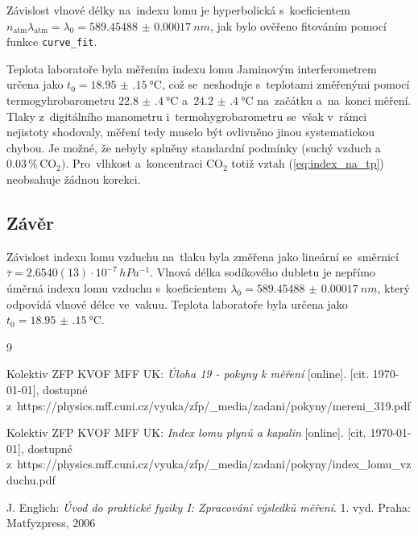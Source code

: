 \documentclass{../concepts/titul_zprava_p/prepareprotokolZprava} %
\begin{document}
Závislost vlnové délky na~indexu lomu je hyperbolická s~koeficientem $n_\mathrm{atm} \lambda_\mathrm{atm} = 
\lambda_0 = \qty{589.45488(17)}{nm}$, jak bylo ověřeno fitováním pomocí funkce \texttt{curve\_fit}.

Teplota laboratoře byla měřením indexu lomu Jaminovým interferometrem určena jako $t_0=\qty{18.95(15)}{\degreeCelsius}$,
což se~neshoduje s~teplotami změřenými pomocí termogyhrobarometru $\qty{22.8(4)}{\degreeCelsius}$ a~$\qty{24.2(4)}{\degreeCelsius}$
na~začátku a~na~konci měření. Tlaky z~digitálního manometru i~termohygrobarometru se~však v~rámci nejistoty shodovaly, měření
tedy muselo být ovlivněno jinou systematickou chybou. Je možné, že nebyly splněny standardní podmínky (suchý vzduch
a~$0.03\,\%\,\mathrm{CO_2})$. Pro~vlhkost a~koncentraci $\mathrm{CO_2}$ totiž vztah (\ref{eq:index_na_tp}) neobsahuje žádnou
korekci.

\subsection{Závěr}
Závislost indexu lomu vzduchu na~tlaku byla změřena jako lineární se~směrnicí 
$\overline{\tau}=2.6540(13)\cdot10^{-7}\,\unit{hPa^{-1}}$. 
Vlnová délka sodíkového dubletu je nepřímo úměrná indexu lomu vzduchu s~koeficientem $\lambda_0=\qty{589.45488(17)}{nm}$, 
který odpovídá vlnové délce ve~vakuu.
Teplota laboratoře byla určena jako $t_0=\qty{18.95(15)}{\degreeCelsius}$.

\begin{thebibliography}{9}


 Kolektiv ZFP KVOF MFF UK: \textit{Úloha 19 - pokyny k měření} [online]. [cit. \today], dostupné
z~https://physics.mff.cuni.cz/vyuka/zfp/\_media/zadani/pokyny/mereni\_319.pdf

 Kolektiv ZFP KVOF MFF UK: \textit{Index lomu plynů a kapalin} [online]. [cit. \today], dostupné
z~https://physics.mff.cuni.cz/vyuka/zfp/\_media/zadani/pokyny/index\_lomu\_vzduchu.pdf


 J. Englich: \textit{Úvod do praktické fyziky I: Zpracování výsledků měření}. 
1. vyd. Praha: Matfyzpress, 2006


\end{thebibliography}
\end{document}
